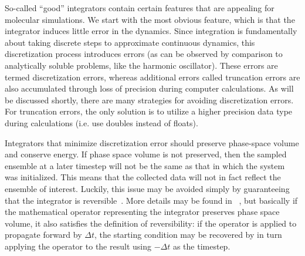 \documentclass[9pt,bestpractices]{livecoms}
\begin{document}
So-called ``good'' integrators contain certain features that are appealing for molecular simulations.
We start with the most obvious feature, which is that the integrator induces little error in the dynamics.
Since integration is fundamentally about taking discrete steps to approximate continuous dynamics, this discretization process introduces errors (as can be observed by comparison to analytically soluble problems, like the harmonic oscillator).
These errors are termed discretization errors, whereas additional errors called truncation errors are also accumulated through loss of precision during computer calculations.
As will be discussed shortly, there are many strategies for avoiding discretization errors.
For truncation errors, the only solution is to utilize a higher precision data type during calculations (i.e. use doubles instead of floats).

Integrators that minimize discretization error should preserve phase-space volume and conserve energy.
If phase space volume is not preserved, then the sampled ensemble at a later timestep will not be the same as that in which the system was initialized.
This means that the collected data will not in fact reflect the ensemble of interest.
Luckily, this issue may be avoided simply by guaranteeing that the integrator is reversible~\cite{Frenkel:2001:}.
More details may be found in ~\citet{Tuckerman:1992:}, but basically if the mathematical operator representing the integrator preserves phase space volume, it also satisfies the definition of reversibility: if the operator is applied to propagate forward by $\Delta t$, the starting condition may be recovered by in turn applying the operator to the result using $- \Delta t$ as the timestep.
\end{document}
